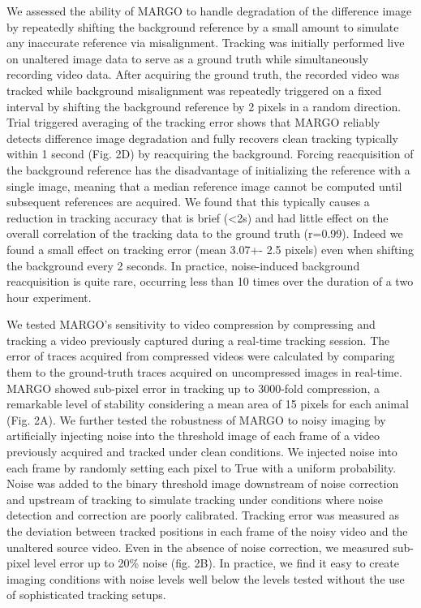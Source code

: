 \documentclass[10pt]{article}
\begin{document}
\begin{multicols}{2}
We assessed the ability of MARGO to handle degradation of the difference image by repeatedly shifting the background reference by a small amount to simulate any inaccurate reference via misalignment. Tracking was initially performed live on unaltered image data to serve as a ground truth while simultaneously recording video data. After acquiring the ground truth, the recorded video was tracked while background misalignment was repeatedly triggered on a fixed interval by shifting the background reference by 2 pixels in a random direction. Trial triggered averaging of the tracking error shows that MARGO reliably detects difference image degradation and fully recovers clean tracking typically within 1 second (Fig. 2D) by reacquiring the background. Forcing reacquisition of the background reference has the disadvantage of initializing the reference with a single image, meaning that a median reference image cannot be computed until subsequent references are acquired. We found that this typically causes a reduction in tracking accuracy that is brief (<2s) and had little effect on the overall correlation of the tracking data to the ground truth (r=0.99). Indeed we found a small effect on tracking error (mean 3.07+- 2.5 pixels) even when shifting the background every 2 seconds. In practice, noise-induced background reacquisition is quite rare, occurring less than 10 times over the duration of a two hour experiment.

We tested MARGO's sensitivity to video compression by compressing and tracking a video previously captured during a real-time tracking session. The error of traces acquired from compressed videos were calculated by comparing them to the ground-truth traces acquired on uncompressed images in real-time. MARGO showed sub-pixel error in tracking up to 3000-fold compression, a remarkable level of stability considering a mean area of 15 pixels for each animal (Fig. 2A). We further tested the robustness of MARGO to noisy imaging by artificially injecting noise into the threshold image of each frame of a video previously acquired and tracked under clean conditions. We injected noise into each frame by randomly setting each pixel to True with a uniform probability. Noise was added to the binary threshold image downstream of noise correction and upstream of tracking to simulate tracking under conditions where noise detection and correction are poorly calibrated. Tracking error was measured as the deviation between tracked positions in each frame of the noisy video and the unaltered source video.  Even in the absence of noise correction, we measured sub-pixel level error up to 20\% noise (fig. 2B). In practice, we find it easy to create imaging conditions with noise levels well below the levels tested without the use of sophisticated tracking setups.


\end{multicols}
\end{document}

